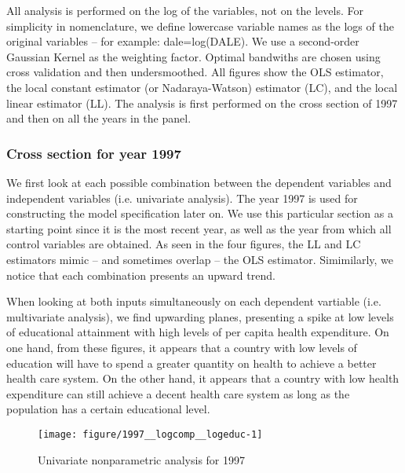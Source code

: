 \documentclass[12pt,a4paper]{article}\usepackage[]{graphicx}\usepackage[]{color}
\newenvironment{knitrout}{}{} %
\begin{document}
All analysis is performed on the log of the variables, not on the levels. For simplicity in nomenclature, we define lowercase variable names as the logs of the original variables -- for example: dale=log(DALE). We use a second-order Gaussian Kernel as the weighting factor. Optimal bandwiths are chosen using cross validation and then undersmoothed. All figures show the OLS estimator, the local constant estimator (or Nadaraya-Watson) estimator (LC), and the local linear estimator (LL). The analysis is first performed on the cross section of 1997 and then on all the years in the panel.




 
\subsubsection{Cross section for year 1997}
 
We first look at each possible combination between the dependent variables and independent variables (i.e. univariate analysis). The year 1997 is used for constructing the model specification later on. We use this particular section as a starting point since it is the most recent year, as well as the year from which all control variables are obtained. As seen in the four figures, the LL and LC estimators mimic -- and sometimes overlap -- the OLS estimator. Simimilarly, we notice that each combination presents an upward trend.
 
When looking at both inputs simultaneously on each dependent vartiable (i.e. multivariate analysis), we find upwarding planes, presenting a spike at low levels of educational attainment with high levels of per capita health expenditure. On one hand, from these figures, it appears that a country with low levels of education will have to spend a greater quantity on health to achieve a better health care system. On the other hand, it appears that a country with low health expenditure can still achieve a decent health care system as long as the population has a certain educational level.

\begin{knitrout}
\color{fgcolor}\begin{figure}[htbp]

{\centering \texttt{[image: figure/1997\_\_logcomp\_\_logeduc-1]} 

}

\caption[Univariate nonparametric analysis for 1997]{Univariate nonparametric analysis for 1997}\label{fig:1997, logcomp, logeduc}
\end{figure}


\end{knitrout}
\end{document}
